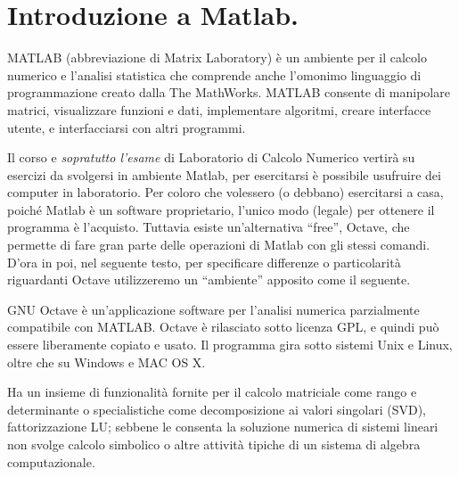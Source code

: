 
\begin{comment}

\begin{codice}
\begin{verbatim}

\end{verbatim}
\end{codice}

\end{comment}

\chapter{Introduzione a Matlab.}
MATLAB (abbreviazione di Matrix Laboratory) è un ambiente per il calcolo 
numerico e l'analisi statistica che comprende anche l'omonimo linguaggio di 
programmazione creato dalla The MathWorks. MATLAB consente di manipolare 
matrici, visualizzare funzioni e dati, implementare algoritmi, creare 
interfacce utente, e interfacciarsi con altri programmi.

\begin{notabene}Il corso e \emph{sopratutto l'esame} di Laboratorio di 
Calcolo Numerico vertirà su esercizi da svolgersi in ambiente Matlab, per
esercitarsi è possibile usufruire dei computer in laboratorio. Per coloro che
volessero (o debbano) esercitarsi a casa, poiché Matlab è un software
proprietario, l'unico modo (legale) per ottenere il programma è l'acquisto.
Tuttavia esiste un'alternativa ``free'', Octave, che permette di fare gran parte
delle operazioni di Matlab con gli stessi comandi. D'ora in poi, nel seguente
testo, per specificare differenze o particolarità riguardanti Octave 
utilizzeremo un ``ambiente'' apposito come il seguente.
\end{notabene}

\begin{octave}
GNU Octave è un'applicazione software per l'analisi numerica parzialmente
 compatibile con MATLAB. Octave è rilasciato sotto licenza GPL, e quindi può 
essere liberamente copiato e usato. Il programma gira sotto sistemi Unix e 
Linux, oltre che su Windows e MAC OS X.

Ha un insieme di funzionalità fornite per il calcolo matriciale come rango e 
determinante o specialistiche come decomposizione ai valori singolari (SVD), 
fattorizzazione LU; sebbene le consenta la soluzione numerica di sistemi 
lineari non svolge calcolo simbolico o altre attività tipiche di un sistema 
di algebra computazionale.
\end{octave}

